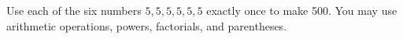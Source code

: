 Use each of the six numbers $5,5,5,5,5,5$ exactly once to make 500. You may use arithmetic operations, powers, factorials, and parentheses.
